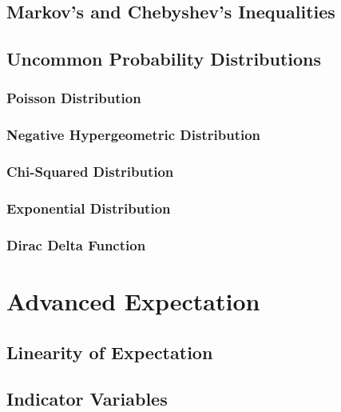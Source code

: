 \documentclass[12pt]{book}
\begin{document}
\section{Markov's and Chebyshev's Inequalities}

\section{Uncommon Probability Distributions}

\subsection{Poisson Distribution}
\subsection{Negative Hypergeometric Distribution}
\subsection{Chi-Squared Distribution}

\subsection{Exponential Distribution}

\subsection{Dirac Delta Function}


\chapter{Advanced Expectation}

\section{Linearity of Expectation}

\section{Indicator Variables}
\end{document}
